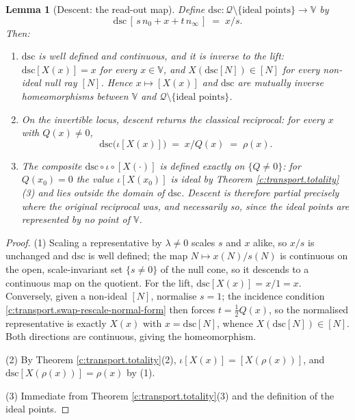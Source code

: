 \documentclass[11pt]{article}
\newtheorem{lemma}[theorem]{Lemma}
\theoremstyle{definition}
\theoremstyle{plain}
\providecommand{\dsc}{}\renewcommand{\dsc}{\mathrm{dsc}}
\providecommand{\nInf}{}\renewcommand{\nInf}{n_\infty}
\providecommand{\nO}{}\renewcommand{\nO}{n_0}
\begin{document}
\begin{lemma}[Descent: the read-out map]\label{c:transport.descent-read-out-map}
Define $\dsc : \mathcal{Q} \setminus \{\text{ideal points}\} \to \mathbb{V}$ by
\[
\dsc\,[\, s\,\nO + x + t\,\nInf \,] \;=\; x/s .
\]
Then:
\begin{enumerate}
\item $\dsc$ is well defined and continuous, and it is inverse to the lift: $\dsc[X(x)] = x$ for every $x \in \mathbb{V}$, and $X(\dsc[N]) \in [N]$ for every non-ideal null ray $[N]$. Hence $x \mapsto [X(x)]$ and $\dsc$ are mutually inverse homeomorphisms between $\mathbb{V}$ and $\mathcal{Q} \setminus \{\text{ideal points}\}$.
\item On the invertible locus, descent returns the classical reciprocal: for every $x$ with $Q(x) \neq 0$,
\[
\dsc\bigl(\iota[X(x)]\bigr) \;=\; x/Q(x) \;=\; \rho(x).
\]
\item The composite $\dsc \circ \iota \circ [X(\cdot)]$ is defined exactly on $\{Q \neq 0\}$: for $Q(x_0) = 0$ the value $\iota[X(x_0)]$ is ideal by Theorem \ref{c:transport.totality}(3) and lies outside the domain of $\dsc$. Descent is therefore partial precisely where the original reciprocal was, and necessarily so, since the ideal points are represented by no point of $\mathbb{V}$.
\end{enumerate}
\end{lemma}
\begin{proof}
(1) Scaling a representative by $\lambda \neq 0$ scales $s$ and $x$ alike, so $x/s$ is unchanged and $\dsc$ is well defined; the map $N \mapsto x(N)/s(N)$ is continuous on the open, scale-invariant set $\{s \neq 0\}$ of the null cone, so it descends to a continuous map on the quotient. For the lift, $\dsc[X(x)] = x/1 = x$. Conversely, given a non-ideal $[N]$, normalise $s = 1$; the incidence condition \ref{c:transport.swap-rescale-normal-form} then forces $t = \tfrac12 Q(x)$, so the normalised representative is exactly $X(x)$ with $x = \dsc[N]$, whence $X(\dsc[N]) \in [N]$. Both directions are continuous, giving the homeomorphism.

(2) By Theorem \ref{c:transport.totality}(2), $\iota[X(x)] = [X(\rho(x))]$, and $\dsc[X(\rho(x))] = \rho(x)$ by (1).

(3) Immediate from Theorem \ref{c:transport.totality}(3) and the definition of the ideal points.

\end{proof}
\end{document}
